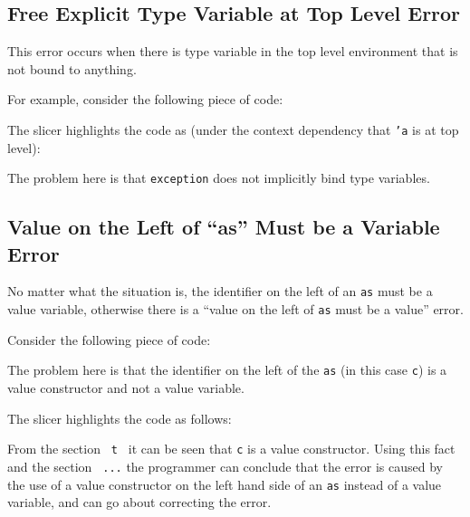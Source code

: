 \documentclass{report}
\begin{document}
\begin{itemize}
\newpage


\subsection{Free Explicit Type Variable at Top Level Error}

\subitem This error occurs when there is type variable in the top
level environment that is not bound to anything.

For example, consider the following piece of code:


The slicer highlights the code as (under the context dependency that
\texttt{'a} is at top level):


The problem here is that \texttt{exception} does not implicitly
bind type variables.

\vspace{0.5in}


\subsection{Value on the Left of ``as'' Must be a Variable Error}

\subitem No matter what the situation is, the identifier on the left
of an \texttt{as} must be a value variable, otherwise there is
a ``value on the left of \texttt{as} must be a value'' error.

Consider the following piece of code:


The problem here is that the identifier on the left of the
\texttt{as} (in this case \texttt{c}) is a value
constructor and not a value variable.

The slicer highlights the code as follows:


From the section \texttt{ t \boxR{=} }
it can be seen that \texttt{c} is a value constructor. Using this
fact and the section \texttt{  ...} the
programmer can conclude that the error is caused by the use of a value
constructor on the left hand side of an \texttt{as} instead of
a value variable, and can go about correcting the error.


\end{itemize}
\end{document}
